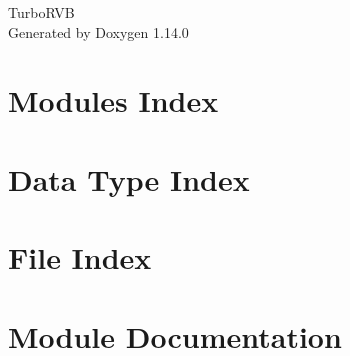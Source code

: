 \documentclass[twoside]{book}
\newcommand{\+}{\discretionary{\mbox{\scriptsize$\hookleftarrow$}}{}{}}
\newcommand{\clearemptydoublepage}{%
    \newpage{\pagestyle{empty}\cleardoublepage}%
  }
\begin{document}
  \raggedbottom
    \hypersetup{pageanchor=false,
                bookmarksnumbered=true,
                pdfencoding=unicode
               }
  \begin{titlepage}
  \vspace*{7cm}
  \begin{center}%
  {\Large Turbo\+RVB}\\
  \vspace*{1cm}
  {\large Generated by Doxygen 1.14.0}\\
  \end{center}
  \end{titlepage}
  \clearemptydoublepage
  \tableofcontents
  \clearemptydoublepage
  \hypersetup{pageanchor=true}

\chapter{Modules Index}

\chapter{Data Type Index}

\chapter{File Index}

\chapter{Module Documentation}


















































\end{document}
